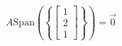\documentclass[preview]{standalone}
\begin{document}
\begin{align*}
A\text{Span}\left(\left\{\begin{bmatrix} 1 \\ 2 \\ 1 \end{bmatrix}\right\}\right) = \vec{0}
\end{align*}
\end{document}
